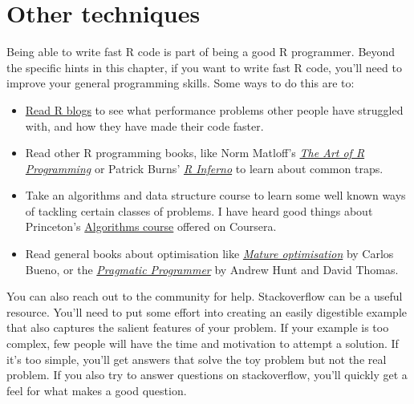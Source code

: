 \hypertarget{more-techniques}{%
\section{Other techniques}\label{more-techniques}}

Being able to write fast R code is part of being a good R programmer.
Beyond the specific hints in this chapter, if you want to write fast R
code, you'll need to improve your general programming skills. Some ways
to do this are to:

\begin{itemize}
\item
  \href{http://www.r-bloggers.com/}{Read R blogs} to see what
  performance problems other people have struggled with, and how they
  have made their code faster.
\item
  Read other R programming books, like Norm Matloff's
  \href{http://amzn.com/1593273843}{\emph{The Art of R Programming}} or
  Patrick Burns'
  \href{http://www.burns-stat.com/documents/books/the-r-inferno/}{\emph{R
  Inferno}} to learn about common traps.
\item
  Take an algorithms and data structure course to learn some well known
  ways of tackling certain classes of problems. I have heard good things
  about Princeton's
  \href{https://www.coursera.org/course/algs4partI}{Algorithms course}
  offered on Coursera.
\item
  Read general books about optimisation like
  \href{http://carlos.bueno.org/optimization/mature-optimization.pdf}{\emph{Mature
  optimisation}} by Carlos Bueno, or the
  \href{http://amzn.com/020161622X}{\emph{Pragmatic Programmer}} by
  Andrew Hunt and David Thomas.
\end{itemize}

You can also reach out to the community for help. Stackoverflow can be a
useful resource. You'll need to put some effort into creating an easily
digestible example that also captures the salient features of your
problem. If your example is too complex, few people will have the time
and motivation to attempt a solution. If it's too simple, you'll get
answers that solve the toy problem but not the real problem. If you also
try to answer questions on stackoverflow, you'll quickly get a feel for
what makes a good question.
